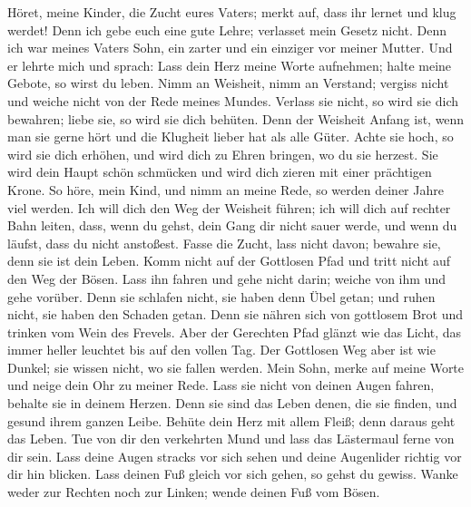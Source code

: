  Höret, meine Kinder, die Zucht eures Vaters; merkt auf,
dass ihr lernet und klug werdet!  Denn ich gebe euch eine
gute Lehre; verlasset mein Gesetz nicht.  Denn ich war
meines Vaters Sohn, ein zarter und ein einziger vor meiner Mutter.
 Und er lehrte mich und sprach: Lass dein Herz meine Worte
aufnehmen; halte meine Gebote, so wirst du leben.  Nimm an
Weisheit, nimm an Verstand; vergiss nicht und weiche nicht von der Rede
meines Mundes.  Verlass sie nicht, so wird sie dich
bewahren; liebe sie, so wird sie dich behüten.  Denn der
Weisheit Anfang ist, wenn man sie gerne hört und die Klugheit lieber hat
als alle Güter.  Achte sie hoch, so wird sie dich erhöhen,
und wird dich zu Ehren bringen, wo du sie herzest.  Sie
wird dein Haupt schön schmücken und wird dich zieren mit einer
prächtigen Krone.  So höre, mein Kind, und nimm an meine
Rede, so werden deiner Jahre viel werden.  Ich will dich
den Weg der Weisheit führen; ich will dich auf rechter Bahn leiten,
 dass, wenn du gehst, dein Gang dir nicht sauer werde,
und wenn du läufst, dass du nicht anstoßest.  Fasse die
Zucht, lass nicht davon; bewahre sie, denn sie ist dein Leben.
 Komm nicht auf der Gottlosen Pfad und tritt nicht auf
den Weg der Bösen.  Lass ihn fahren und gehe nicht darin;
weiche von ihm und gehe vorüber.  Denn sie schlafen
nicht, sie haben denn Übel getan; und ruhen nicht, sie haben den Schaden
getan.  Denn sie nähren sich von gottlosem Brot und
trinken vom Wein des Frevels.  Aber der Gerechten Pfad
glänzt wie das Licht, das immer heller leuchtet bis auf den vollen Tag.
 Der Gottlosen Weg aber ist wie Dunkel; sie wissen nicht,
wo sie fallen werden.  Mein Sohn, merke auf meine Worte
und neige dein Ohr zu meiner Rede.  Lass sie nicht von
deinen Augen fahren, behalte sie in deinem Herzen.  Denn
sie sind das Leben denen, die sie finden, und gesund ihrem ganzen Leibe.
 Behüte dein Herz mit allem Fleiß; denn daraus geht das
Leben.  Tue von dir den verkehrten Mund und lass das
Lästermaul ferne von dir sein.  Lass deine Augen stracks
vor sich sehen und deine Augenlider richtig vor dir hin blicken.
 Lass deinen Fuß gleich vor sich gehen, so gehst du
gewiss.  Wanke weder zur Rechten noch zur Linken; wende
deinen Fuß vom Bösen.

